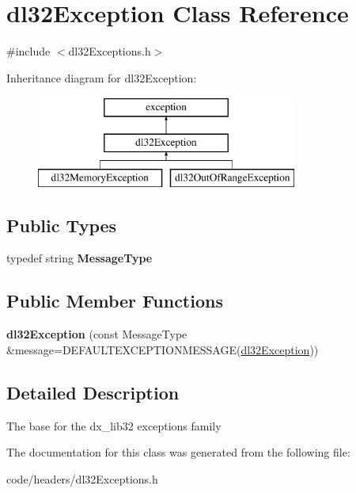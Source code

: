 \hypertarget{classdl32_exception}{\section{dl32\-Exception Class Reference}
\label{classdl32_exception}
}


{\ttfamily \#include $<$dl32\-Exceptions.\-h$>$}

Inheritance diagram for dl32\-Exception\-:\begin{figure}[H]
\begin{center}
\leavevmode
\includegraphics[height=3.000000cm]{classdl32_exception}
\end{center}
\end{figure}
\subsection*{Public Types}
\begin{DoxyCompactItemize}
\item 
\hypertarget{classdl32_exception_ad88bf995878838dc4db8fc62a25a008f}{typedef string {\bfseries Message\-Type}}\label{classdl32_exception_ad88bf995878838dc4db8fc62a25a008f}

\end{DoxyCompactItemize}
\subsection*{Public Member Functions}
\begin{DoxyCompactItemize}
\item 
\hypertarget{classdl32_exception_a42d6678397474d737552d0bee7fcde89}{{\bfseries dl32\-Exception} (const Message\-Type \&message=D\-E\-F\-A\-U\-L\-T\-E\-X\-C\-E\-P\-T\-I\-O\-N\-M\-E\-S\-S\-A\-G\-E(\hyperlink{classdl32_exception}{dl32\-Exception}))}\label{classdl32_exception_a42d6678397474d737552d0bee7fcde89}

\end{DoxyCompactItemize}


\subsection{Detailed Description}
The base for the dx\-\_\-lib32 exceptions family 

The documentation for this class was generated from the following file\-:\begin{DoxyCompactItemize}
\item 
code/headers/dl32\-Exceptions.\-h\end{DoxyCompactItemize}
